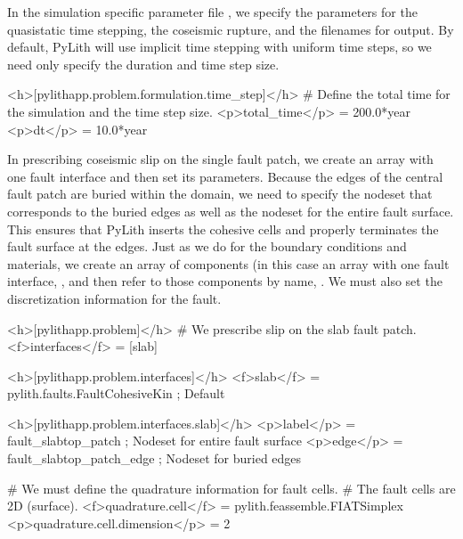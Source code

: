 In the simulation specific parameter file , we
specify the parameters for the quasistatic time stepping, the
coseismic rupture, and the filenames for output. By default, PyLith
will use implicit time stepping with uniform time steps, so we need
only specify the duration and time step size.
\begin{cfg}
<h>[pylithapp.problem.formulation.time_step]</h>
# Define the total time for the simulation and the time step size.
<p>total_time</p> = 200.0*year
<p>dt</p> = 10.0*year
\end{cfg}

In prescribing coseismic slip on the single fault patch, we create an
array with one fault interface and then set its parameters. Because
the edges of the central fault patch are buried within the domain, we
need to specify the nodeset that corresponds to the buried edges as
well as the nodeset for the entire fault surface. This ensures that
PyLith inserts the cohesive cells and properly terminates the fault
surface at the edges. Just as we do for the boundary conditions and
materials, we create an array of components (in this case an array
with one fault interface, , and then refer to those
components by name, . We
must also set the discretization information for the fault.
\begin{cfg}
<h>[pylithapp.problem]</h>
# We prescribe slip on the slab fault patch.
<f>interfaces</f> = [slab]

<h>[pylithapp.problem.interfaces]</h>
<f>slab</f> = pylith.faults.FaultCohesiveKin ; Default

<h>[pylithapp.problem.interfaces.slab]</h>
<p>label</p> = fault_slabtop_patch ; Nodeset for entire fault surface
<p>edge</p> = fault_slabtop_patch_edge ; Nodeset for buried edges

# We must define the quadrature information for fault cells.
# The fault cells are 2D (surface).
<f>quadrature.cell</f> = pylith.feassemble.FIATSimplex
<p>quadrature.cell.dimension</p> = 2
\end{cfg}

